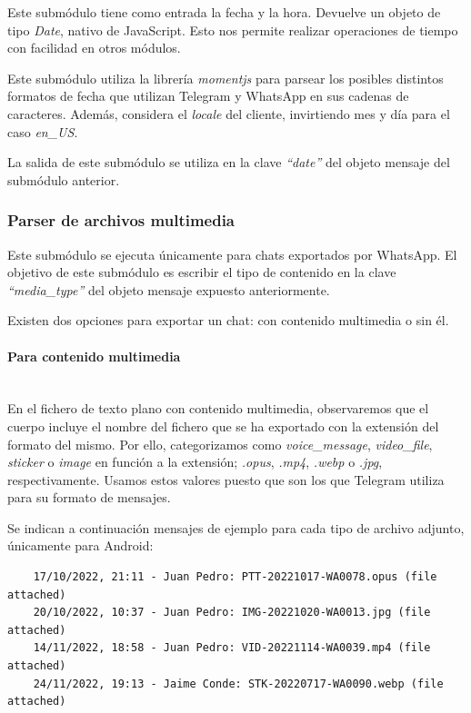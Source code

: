 Este submódulo tiene como entrada la fecha y la hora. Devuelve un objeto de tipo \textit{Date}, nativo de JavaScript. Esto nos permite realizar operaciones de tiempo con facilidad en otros módulos.

Este submódulo utiliza la librería \textit{momentjs} para parsear los posibles distintos formatos de fecha que utilizan Telegram y WhatsApp en sus cadenas de caracteres. Además, considera el \textit{locale} del cliente, invirtiendo mes y día para el caso \textit{en\_US}.

La salida de este submódulo se utiliza en la clave \textit{``date''} del objeto mensaje del submódulo anterior.

\subsubsection{Parser de archivos multimedia}

Este submódulo se ejecuta únicamente para chats exportados por WhatsApp. El objetivo de este submódulo es escribir el tipo de contenido en la clave \textit{``media\_type''} del objeto mensaje expuesto anteriormente.

Existen dos opciones para exportar un chat: con contenido multimedia o sin él.

\paragraph{Para contenido multimedia}\mbox{}\\

En el fichero de texto plano con contenido multimedia, observaremos que el cuerpo incluye el nombre del fichero que se ha exportado con la extensión del formato del mismo. Por ello, categorizamos como \textit{voice\_message}, \textit{video\_file}, \textit{sticker} o \textit{image} en función a la extensión; \textit{.opus}, \textit{.mp4}, \textit{.webp} o \textit{.jpg}, respectivamente. Usamos estos valores puesto que son los que Telegram utiliza para su formato de mensajes.

Se indican a continuación mensajes de ejemplo para cada tipo de archivo adjunto, únicamente para Android:

\begin{lstlisting}
	17/10/2022, 21:11 - Juan Pedro: PTT-20221017-WA0078.opus (file attached)
	20/10/2022, 10:37 - Juan Pedro: IMG-20221020-WA0013.jpg (file attached)
	14/11/2022, 18:58 - Juan Pedro: VID-20221114-WA0039.mp4 (file attached)
	24/11/2022, 19:13 - Jaime Conde: STK-20220717-WA0090.webp (file attached)
\end{lstlisting}


